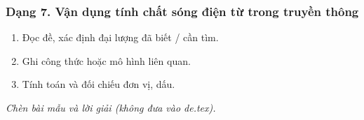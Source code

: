\subsubsection{Dạng 7. Vận dụng tính chất sóng điện từ trong truyền thông}
\begin{phuongphap}
\begin{enumerate}
\item Đọc đề, xác định đại lượng đã biết / cần tìm.
\item Ghi công thức hoặc mô hình liên quan.
\item Tính toán và đối chiếu đơn vị, dấu.
\end{enumerate}
\end{phuongphap}
\begin{vidumau}
\textit{Chèn bài mẫu và lời giải (không đưa vào de.tex).}
\end{vidumau}

